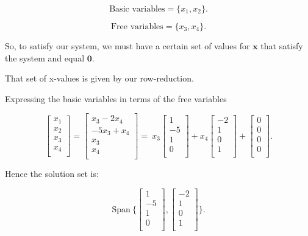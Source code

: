 \documentclass{article}
\begin{document}
\[
    \text{Basic variables} = \{ x_1, x_2 \}
.\]


\[
    \text{Free variables} = \{ x_3, x_4 \}
.\]


So, to satisfy our system, we must have a certain set of values for $\mathbf{x}$
that satisfy the system and equal $\mathbf{0}$.

That set of x-values is given by our row-reduction.

Expressing the basic variables in terms of the free variables

\[
    \begin{bmatrix}
        x_1 \\ x_2 \\ x_3 \\ x_4 \\
    \end{bmatrix}
    =
    \begin{bmatrix}
        x_3 - 2 x_4     \\
        -5 x_3 + x_4    \\ 
        x_3 \\ x_4      \\
    \end{bmatrix}
    = \
    x_3
    \begin{bmatrix}
        1 \\ -5 \\ 1 \\ 0 \\
    \end{bmatrix}
    + 
    x_4
    \begin{bmatrix}
        -2 \\ 1 \\ 0 \\ 1 \\
    \end{bmatrix}
    +
    \begin{bmatrix}
        0 \\ 0 \\ 0 \\ 0 \\
    \end{bmatrix}
.\]


Hence the solution set is:

\[
    \text{Span} \
    \bigg\{ 
    \begin{bmatrix}
        1 \\ -5 \\ 1 \\ 0 \\
    \end{bmatrix}
    ,
    \begin{bmatrix}
        -2 \\ 1 \\ 0 \\ 1 \\
    \end{bmatrix}
    \bigg\}
.\]
\end{document}
